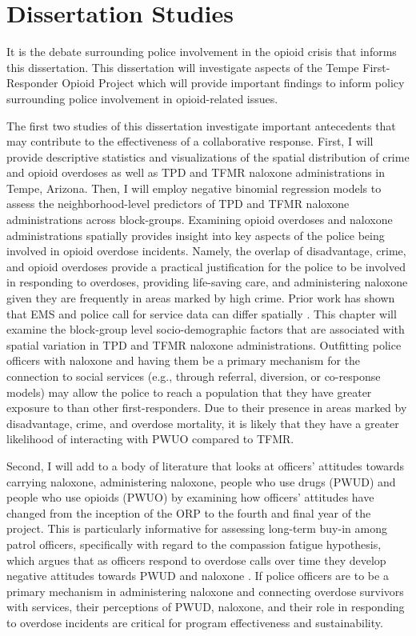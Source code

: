\section{\centering Dissertation Studies}
It is the debate surrounding police involvement in the opioid crisis that informs this dissertation. This dissertation will investigate aspects of the Tempe First-Responder Opioid Project which will provide important findings to inform policy surrounding police involvement in opioid-related issues.

The first two studies of this dissertation investigate important antecedents that may contribute to the effectiveness of a collaborative response. First, I will provide descriptive statistics and visualizations of the spatial distribution of crime and opioid overdoses as well as TPD and TFMR naloxone administrations in Tempe, Arizona. Then, I will employ negative binomial regression models to assess the neighborhood-level predictors of TPD and TFMR naloxone administrations across block-groups. Examining opioid overdoses and naloxone administrations spatially provides insight into key aspects of the police being involved in opioid overdose incidents. Namely, the overlap of disadvantage, crime, and opioid overdoses provide a practical justification for the police to be involved in responding to overdoses, providing life-saving care, and administering naloxone given they are frequently in areas marked by high crime. Prior work has shown that EMS and police call for service data can differ spatially \parencite{hibdon_concentration_2017, hibdon_going_2021}. This chapter will examine the block-group level socio-demographic factors that are associated with spatial variation in TPD and TFMR naloxone administrations. Outfitting police officers with naloxone and having them be a primary mechanism for the connection to social services (e.g., through referral, diversion, or co-response models) may allow the police to reach a population that they have greater exposure to than other first-responders. Due to their presence in areas marked by disadvantage, crime, and overdose mortality, it is likely that they have a greater likelihood of interacting with PWUO compared to TFMR. 

Second, I will add to a body of literature that looks at officers’ attitudes towards carrying naloxone, administering naloxone, people who use drugs (PWUD) and people who use opioids (PWUO) by examining how officers’ attitudes have changed from the inception of the ORP to the fourth and final year of the project. This is particularly informative for assessing long-term buy-in among patrol officers, specifically with regard to the compassion fatigue hypothesis, which argues that as officers respond to overdose calls over time they develop negative attitudes towards PWUD and naloxone \parencite{carroll_knowledge_2020, murphy_police_2020, murphy_police_2021}. If police officers are to be a primary mechanism in administering naloxone and connecting overdose survivors with services, their perceptions of PWUD, naloxone, and their role in responding to overdose incidents are critical for program effectiveness and sustainability. 

